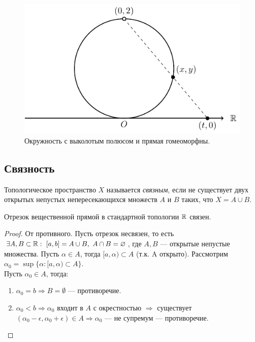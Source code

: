 \begin{figure}[h]
    \centering
    \includegraphics{images/c1.1.pdf}
    \caption{Окружность с выколотым полюсом и прямая гомеоморфны.}
    \label{fig:c1.1}
\end{figure}


\subsection{Связность}
\begin{definition}
    Топологическое пространство $X$ называется \textit{связным}, если не существует двух открытых непустых непересекающихся множеств $A$ и $B$ таких, что $X = A \cup B$.
\end{definition}

\begin{statement}
    Отрезок вещественной прямой в стандартной топологии $\mathbb{R}$ связен.
\end{statement}
\begin{proof}
    От противного. Пусть отрезок несвязен, то есть $\exists A, B \subset \mathbb{R}: \ [a, b] = A \cup B, \ A \cap B = \varnothing$, где $A, B$ — открытые непустые множества. Пусть $\alpha \in A$, тогда $[a, \alpha) \subset A$ (т.к. A открыто). Рассмотрим $\alpha_0 = \sup\{ {\alpha}: [a, \alpha) \subset A\}$. \\
    Пусть $\alpha_0 \in A$, тогда:
    \begin{enumerate}
        \item $\alpha_0 = b \Longrightarrow B = \emptyset$ — противоречие.
        \item $\alpha_0 < b \Longrightarrow \alpha_0$ входит в $A$ с окрестностью $\Longrightarrow$ существует $(\alpha_0 - \epsilon, \alpha_0 + \epsilon) \in A \Longrightarrow \alpha_0$ — не супремум — противоречие.
    \end{enumerate}
\end{proof}

